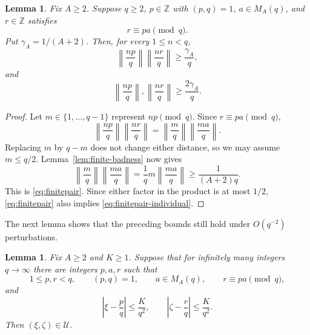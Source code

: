 \documentclass[11pt]{amsart}
\newtheorem{lemma}[theorem]{Lemma}
\newcommand{\Z}{\mathbb Z}
\begin{document}
\begin{lemma}\label{lem:finite-pair}
Fix $A\ge2$.  Suppose $q\ge2$, $p\in\Z$ with $(p,q)=1$,
$a\in M_A(q)$, and $r\in\Z$ satisfies
$$
 r\equiv pa\pmod q.
$$
Put $\gamma_A=1/(A+2)$.  Then, for every $1\le n<q$,
\begin{equation}\label{eq:finitepair}
 \left\|\frac{np}{q}\right\|
 \left\|\frac{nr}{q}\right\|\ge\frac{\gamma_A}{q},
\end{equation}
and
\begin{equation}\label{eq:finitepair-individual}
 \left\|\frac{np}{q}\right\|,
 \left\|\frac{nr}{q}\right\|\ge\frac{2\gamma_A}{q}.
\end{equation}
\end{lemma}

\begin{proof}
Let $m\in\{1,\ldots,q-1\}$ represent $np\pmod q$.  Since
$r\equiv pa\pmod q$,
$$
 \left\|\frac{np}{q}\right\|
 \left\|\frac{nr}{q}\right\|
 =\left\|\frac mq\right\|
  \left\|\frac{ma}{q}\right\|.
$$
Replacing $m$ by $q-m$ does not change either distance, so we may assume
$m\le q/2$.  Lemma~\ref{lem:finite-badness} now gives
$$
 \left\|\frac mq\right\|
 \left\|\frac{ma}{q}\right\|
 =\frac1q m\left\|\frac{ma}{q}\right\|
 \ge\frac1{(A+2)q}.
$$
This is \eqref{eq:finitepair}.  Since either factor in the product is at most
$1/2$, \eqref{eq:finitepair} also implies
\eqref{eq:finitepair-individual}.
\end{proof}

The next lemma shows that the preceding bounds still hold under $O(q^{-2})$ perturbations.

\begin{lemma}\label{lem:limit-pair}
Fix $A\ge2$ and $K\ge1$.  Suppose that for infinitely many integers
$q\to\infty$ there are integers $p,a,r$ such that
$$
 1\le p,r<q,\qquad (p,q)=1,\qquad a\in M_A(q),
 \qquad r\equiv pa\pmod q,
$$
and
\begin{equation}\label{eq:quadratic-approximation-pair}
 \left|\xi-\frac pq\right|\le\frac K{q^2},
 \qquad
 \left|\zeta-\frac rq\right|\le\frac K{q^2}.
\end{equation}
Then $(\xi,\zeta)\in \mathcal U$.
\end{lemma}
\end{document}
